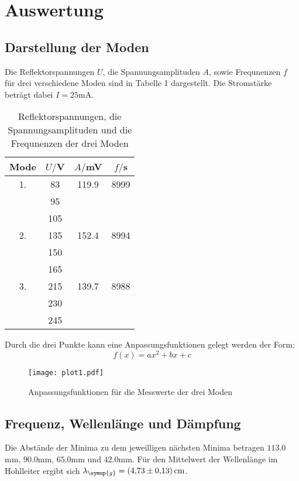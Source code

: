 \section{Auswertung}
\label{sec:Auswertung}

\subsection{Darstellung der Moden}
Die Reflektorspannungen $U$, die Spannungsamplituden $A$, sowie Frequnenzen $f$ für drei verschiedene Moden sind in Tabelle 1 dargestellt.
Die Stromstärke beträgt dabei $I = 25$mA.



\begin{table}[H]
  \centering
  \caption{Reflektorspannungen, die Spannungsamplituden und die Frequnenzen der drei Moden}
  \label{tab:Parameter}
  \begin{tabular}{c c c c}
    \toprule
    Mode & $U/$V & $A/$mV& $f/$s\\
    \midrule
    1. & 83  &   119.9& 8999 \\
       & 95  & &       \\
       & 105 & &       \\
    2. & 135 &    152.4 & 8994 \\
       & 150 & & \\
       & 165 & & \\
    3. & 215 &  139.7  & 8988 \\
       & 230 & & \\
       & 245 & & \\
    \bottomrule
  \end{tabular}
\end{table}

Durch die drei Punkte kann eine Anpassungsfunktionen gelegt werden der Form:
\begin{equation*}
  f(x)=ax^2+bx+c
\end{equation*}
\begin{figure}
  \centering
  \texttt{[image: plot1.pdf]}
  \caption{Anpassungsfunktionen für die Messwerte der drei Moden}
  \label{fig:plot}
\end{figure}



\subsection{Frequenz, Wellenlänge und Dämpfung}
Die Abstände der Minima zu dem jeweilligen nächsten Minima betragen $113.0$mm, $90.0$mm,
$65.0$mm und $42.0$mm.
Für den Mittelwert der Wellenlänge im Hohlleiter ergibt sich $\lambda_{\symup{g}} =\SI{4.73(13)}{\centi\meter}$.

